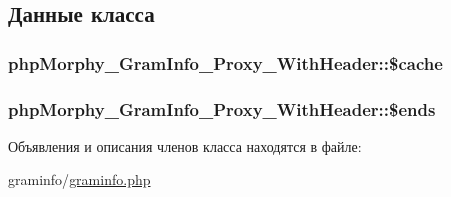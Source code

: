 \subsection{Данные класса}
\hypertarget{classphpMorphy__GramInfo__Proxy__WithHeader_a2b13acf1e1159e4d41989babbf726088}{
\subsubsection[{\$cache}]{\setlength{\rightskip}{0pt plus 5cm}phpMorphy\_\-GramInfo\_\-Proxy\_\-WithHeader::\$cache}}
\label{classphpMorphy__GramInfo__Proxy__WithHeader_a2b13acf1e1159e4d41989babbf726088}
\hypertarget{classphpMorphy__GramInfo__Proxy__WithHeader_a62e759868eb65ba5b8d2c300f0da35f4}{
\subsubsection[{\$ends}]{\setlength{\rightskip}{0pt plus 5cm}phpMorphy\_\-GramInfo\_\-Proxy\_\-WithHeader::\$ends}}
\label{classphpMorphy__GramInfo__Proxy__WithHeader_a62e759868eb65ba5b8d2c300f0da35f4}


Объявления и описания членов класса находятся в файле:\begin{DoxyCompactItemize}
\item 
graminfo/\hyperlink{graminfo_8php}{graminfo.php}\end{DoxyCompactItemize}
